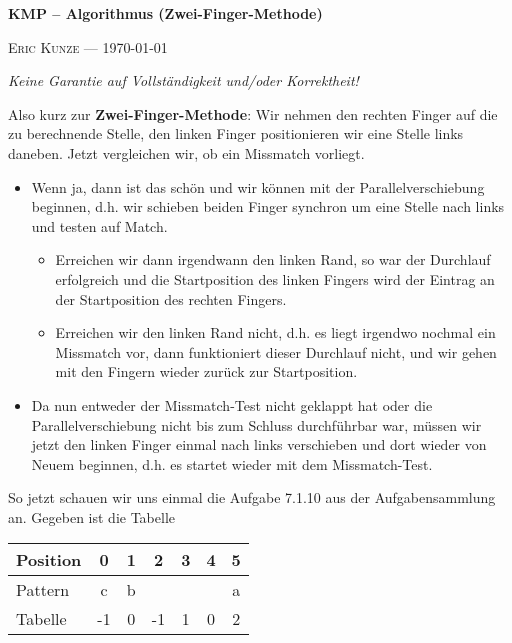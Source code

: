 \documentclass[a4paper, 12pt]{article}
\newcommand*\ruleline[1]{\par\noindent\raisebox{.8ex}{\makebox[\linewidth]{\hrulefill\hspace{1ex}\raisebox{-.8ex}{#1}\hspace{1ex}\hrulefill}}}
\begin{document}
	
	\begin{center}
		{\bfseries \sffamily \LARGE KMP -- Algorithmus (Zwei-Finger-Methode)} 
		
		\ruleline{\sffamily \large Übungsblatt 9}
		
		{\scshape \small Eric Kunze --- \today}
	\end{center}
	\medskip
	
	{ \footnotesize \doclicenseThis }
	
	\begin{center}
		\small \slshape Keine Garantie auf Vollständigkeit und/oder Korrektheit!
	\end{center}
	
	Also kurz zur \textbf{Zwei-Finger-Methode}: Wir nehmen den rechten Finger auf die zu berechnende Stelle, den linken Finger positionieren wir eine Stelle links daneben. Jetzt vergleichen wir, ob ein Missmatch vorliegt.
	\begin{itemize}
		\item Wenn ja, dann ist das schön und wir können mit der Parallelverschiebung beginnen, d.h. wir schieben beiden Finger synchron um eine Stelle nach links und testen auf Match. 
		\begin{itemize}
			\item Erreichen wir dann irgendwann den linken Rand, so war der Durchlauf erfolgreich und die Startposition des linken Fingers wird der Eintrag an der Startposition des rechten Fingers.
			\item Erreichen wir den linken Rand nicht, d.h. es liegt irgendwo nochmal ein Missmatch vor, dann funktioniert dieser Durchlauf nicht, und wir gehen mit den Fingern wieder zurück zur Startposition.
		\end{itemize}
		\item Da nun entweder der Missmatch-Test nicht geklappt hat oder die Parallelverschiebung nicht bis zum Schluss durchführbar war, müssen wir jetzt den linken Finger einmal nach links verschieben und dort wieder von Neuem beginnen, d.h. es startet wieder mit dem Missmatch-Test.
	\end{itemize}

	So jetzt schauen wir uns einmal die Aufgabe 7.1.10 aus der Aufgabensammlung an.
	Gegeben ist die Tabelle
	
	\begin{center}
		\begin{tabular}{l|cccccc}
			Position & 0 & 1 & 2 & 3 & 4 & 5 \\  \hline
			Pattern & c & b & & & & a \\ \hline
			Tabelle & -1 & 0 & -1 & 1 & 0 & 2
		\end{tabular}
	\end{center}
\end{document}
